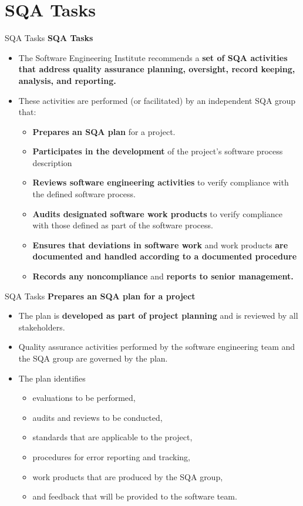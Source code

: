\documentclass{beamer}
\begin{document}
\section{SQA Tasks}
\begin{frame}{SQA Tasks}
	\textbf{SQA Tasks}
	\begin{itemize}
		\item The Software Engineering Institute recommends a\textbf{ set of SQA activities that address quality
			assurance planning, oversight, record keeping, analysis, and reporting. }
		\item These activities are
		performed (or facilitated) by an independent SQA group that:

		\begin{itemize}
			\item \textbf{Prepares an SQA plan} for a project.
			\item \textbf{Participates in the development} of the project’s software process description
			\item \textbf{Reviews software engineering activities} to verify compliance with the defined software
			process.
			\item \textbf{Audits designated software work products} to verify compliance with those defined as part of
			the software process.
			\item \textbf{Ensures that deviations in software work} and work products \textbf{are documented and handled
				according to a documented procedure}
			\item \textbf{Records any noncompliance} and \textbf{reports to senior management.}
		\end{itemize}
	\end{itemize}
\end{frame}
\begin{frame}{SQA Tasks}
	\textbf{Prepares an SQA plan for a project}
	\begin{itemize}
		\item The plan is \textbf{developed as part of project planning} and is reviewed by all stakeholders. 
		\item Quality assurance activities performed by the software engineering team and the SQA group are governed by the plan.
		\item The plan identifies
		\begin{itemize}
			\item evaluations to be performed,
			\item  audits and reviews to be conducted,
			\item standards that are applicable to the project,
			\item  procedures for error reporting and tracking, 
			\item work products that are produced by the SQA group,
			\item and feedback that will be provided to the software team.
		\end{itemize} 
		
	\end{itemize}
\end{frame}
\end{document}
